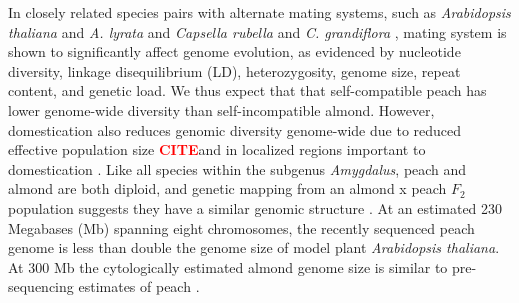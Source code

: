 \documentclass[12pt]{article}
\newcommand{\citex}{\textcolor{red}{\bf CITE}}
\begin{document}
In closely related species pairs with alternate mating systems, such as \emph{Arabidopsis thaliana} and \emph{A. lyrata} and \emph{Capsella rubella} and \emph{C. grandiflora} \citep{slotte2013capsella}, mating system is shown to significantly affect genome evolution, as evidenced by nucleotide diversity, linkage disequilibrium (LD), heterozygosity, genome size, repeat content, and genetic load.
%
We thus expect that that self-compatible peach has lower genome-wide diversity than self-incompatible almond.
%
However, domestication also reduces genomic diversity genome-wide due to reduced effective population size \citex and in localized regions important to domestication \citep{glemin2006impact, doebley2006molecular}. 
%
%
%
%
Like all species within the subgenus \emph{Amygdalus}, peach and almond are both diploid, and genetic mapping from an almond x peach $F_{2}$ population suggests they have a similar genomic structure \citep{dirlewanger2004comparative}. 
%
At an estimated 230 Megabases (Mb) spanning eight chromosomes, the recently sequenced peach genome \citep{verde2013high} is less than double the genome size of model plant \emph{Arabidopsis thaliana}. 
%
At 300 Mb the cytologically estimated almond genome size is similar to pre-sequencing estimates of peach \citep{arumuganathan1991nuclear}. 
%
%
\end{document}
